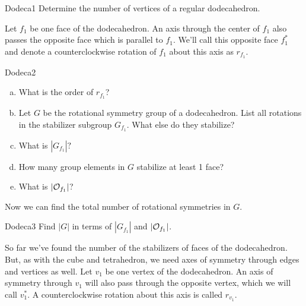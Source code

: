 \begin{exercise}{Dodeca1}
Determine the number of vertices of a regular dodecahedron.
\end{exercise}
Let $f_1$ be one face of the dodecahedron.  An axis through the center of $f_1$ also passes the opposite face which is parallel to $f_1$. We'll call this opposite face $f_1^*$ and denote a counterclockwise rotation of $f_1$ about this axis as $r_{f_1}$.

\begin{exercise}{Dodeca2}
\begin {enumerate}[(a)]
\item What is the order of $r_{f_1}$?
\item Let $G$ be the rotational symmetry group of a dodecahedron.  List all rotations in the stabilizer subgroup $G_{f_1}$.  What else do they stabilize?
\item What is $|G_{f_1}|?$
\item How many group elements in $G$ stabilize at least 1 face?
\item What is $|{\cal O}_{f_1}|$?
\end{enumerate}
\end{exercise}
Now we can find the total number of rotational symmetries in $G$.

\begin {exercise}{Dodeca3}
Find $|G|$ in terms of $|G_{f_1}|$ and $|{\cal O}_{f_1}|$.
\end {exercise}
So far we've found the number of the stabilizers of faces of the dodecahedron.  But, as with the cube and tetrahedron, we need axes of symmetry through edges and vertices as well.
Let $v_1$ be one vertex of the dodecahedron.  An axis of symmetry through $v_1$ will also pass through the opposite vertex, which we will call $v_1^*$.  A counterclockwise rotation about this axis is called $r_{v_1}$.

